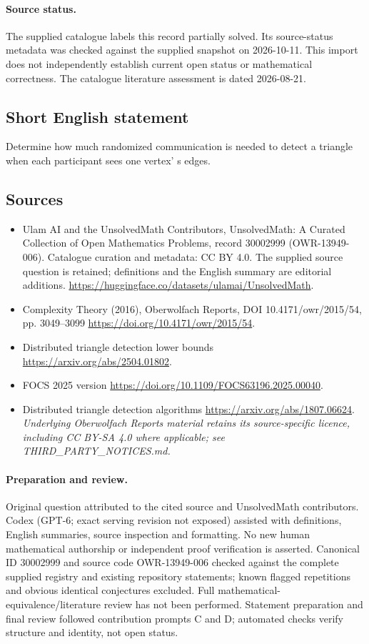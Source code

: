 \documentclass[11pt]{article}
\begin{document}
\paragraph{Source status.}
The supplied catalogue labels this record partially solved. Its source-status metadata was checked against the supplied snapshot on 2026-10-11. This import does not independently establish current open status or mathematical correctness. The catalogue literature assessment is dated 2026-08-21.
\subsection{Short English statement}
Determine how much randomized communication is needed to detect a triangle when each participant sees one vertex' s edges.
\subsection{Sources}
\begin{itemize}
\item[\hypertarget{source:30002999:1}{S1}] Ulam AI and the UnsolvedMath Contributors, UnsolvedMath: A Curated Collection of Open Mathematics Problems, record 30002999 (OWR-13949-006). Catalogue curation and metadata: CC BY 4.0. The supplied source question is retained; definitions and the English summary are editorial additions.
\url{https://huggingface.co/datasets/ulamai/UnsolvedMath}.
\item[\hypertarget{source:30002999:2}{S2}] Complexity Theory (2016), Oberwolfach Reports, DOI 10.4171/owr/2015/54, pp. 3049--3099
\url{https://doi.org/10.4171/owr/2015/54}.
\item[\hypertarget{source:30002999:3}{S3}] Distributed triangle detection lower bounds
\url{https://arxiv.org/abs/2504.01802}.
\item[\hypertarget{source:30002999:4}{S4}] FOCS 2025 version
\url{https://doi.org/10.1109/FOCS63196.2025.00040}.
\item[\hypertarget{source:30002999:5}{S5}] Distributed triangle detection algorithms
\url{https://arxiv.org/abs/1807.06624}.
\textit{Underlying Oberwolfach Reports material retains its source-specific licence, including CC BY-SA 4.0 where applicable; see THIRD\_PARTY\_NOTICES.md.}
\end{itemize}
\paragraph{Preparation and review.}
Original question attributed to the cited source and UnsolvedMath contributors. Codex (GPT-6; exact serving revision not exposed) assisted with definitions, English summaries, source inspection and formatting. No new human mathematical authorship or independent proof verification is asserted. Canonical ID 30002999 and source code OWR-13949-006 checked against the complete supplied registry and existing repository statements; known flagged repetitions and obvious identical conjectures excluded. Full mathematical-equivalence/literature review has not been performed. Statement preparation and final review followed contribution prompts C and D; automated checks verify structure and identity, not open status.
\label{end:30002999}
\end{document}
